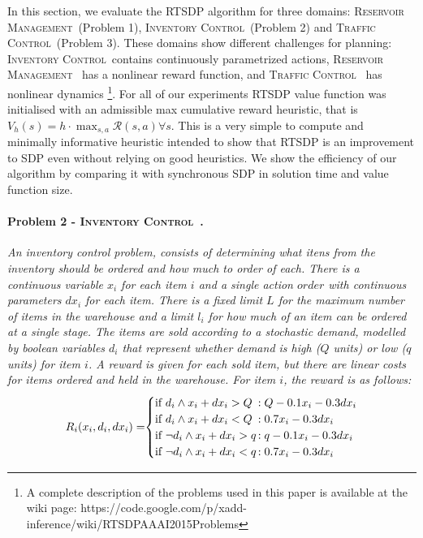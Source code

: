 \documentclass[letterpaper]{article}
\newcommand{\Invent}{\textsc{Inventory Control}}
\newcommand{\Traffic}{\textsc{Traffic Control}}
\newcommand{\Reservoir}{\textsc{Reservoir Management}}
\begin{document}
In this section, we evaluate the RTSDP algorithm for three domains: \Reservoir~(Problem 1), \Invent~(Problem 2) and \Traffic~(Problem 3). These domains show different challenges for planning: \Invent~contains continuously parametrized actions, \Reservoir~ has a nonlinear reward function, and \Traffic~ has nonlinear dynamics \footnote{A complete description of the problems used in this paper is available at the wiki page: https://code.google.com/p/xadd-inference/wiki/RTSDPAAAI2015Problems}.
For all of our experiments RTSDP value function was initialised with an admissible max cumulative reward heuristic, that is $V_h(s) = h \cdot \max_{s,a} \mathcal{R}(s,a) \forall s$. This is a very simple to compute and minimally informative heuristic intended to show that RTSDP is an improvement to SDP even without relying on good heuristics.
We show the efficiency of our algorithm by comparing it with synchronous SDP in solution time and value function size.

\paragraph{\bf Problem 2 - \Invent ~\cite{scarf2002}. \label{ex2}}
\textit{An inventory control problem, consists of determining what itens from the inventory should be ordered and how much to order of each. There is a continuous variable $x_i$ for each item $i$ and a single action $order$ with continuous parameters $dx_i$ for each item. There is a fixed limit $L$ for the maximum number of items in the warehouse and a limit $l_i$ for how much of an item can be ordered at a single stage. The items are sold according to a stochastic demand, modelled by boolean variables $d_i$ that represent whether demand is high ($Q$ units) or low ($q$ units) for item $i$. A reward is given for each sold item, but there are linear costs for items ordered and held in the warehouse. For item $i$, the reward is as follows:
{\small
\begin{align*}
R_{i} (x_i, d_i, dx_i)= \hspace{-1mm}
\begin{cases}
  \text{if }  d_i \wedge x_i + dx_i > Q &\hspace{-3mm} : Q - 0.1x_i - 0.3dx_i\\ 
  \text{if }  d_i \wedge x_i + dx_i < Q &\hspace{-3mm} : 0.7x_i - 0.3dx_i\\ 
  \text{if }  \neg d_i \wedge x_i + dx_i > q &\hspace{-3mm} : q - 0.1x_i - 0.3dx_i\\ 
  \text{if }  \neg d_i \wedge x_i+dx_i < q &\hspace{-3mm} : 0.7x_i - 0.3dx_i\\ 
\end{cases}
\end{align*}
}
}
\end{document}
